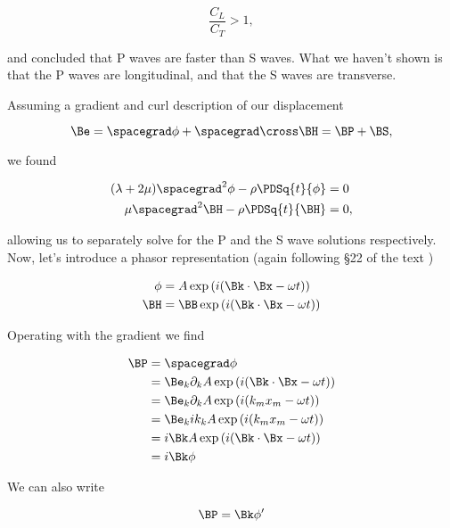 \begin{equation}\label{eqn:continuumL8:70}
\frac{C_L}{C_T} > 1,
\end{equation}

and concluded that P waves are faster than S waves.  What we haven't shown is that the P waves are longitudinal, and that the S waves are transverse.

Assuming a gradient and curl description of our displacement

\begin{equation}\label{eqn:continuumL8:90}
\Be = \spacegrad \phi + \spacegrad \cross \BH = \BP + \BS,
\end{equation}

we found

\begin{align}\label{eqn:continuumL8:110}
(\lambda + 2 \mu) \spacegrad^2 \phi - \rho \PDSq{t}{\phi} &= 0 \\
\mu \spacegrad^2 \BH - \rho \PDSq{t}{\BH} &= 0,
\end{align}

allowing us to separately solve for the P and the S wave solutions respectively.  Now, let's introduce a phasor representation (again following \S 22 of the text \cite{landau1960theory})

\begin{align}\label{eqn:continuumL8:130}
\phi &= A \exp\left( i ( \Bk \cdot \Bx - \omega t) \right) \\
\BH &= \BB \exp\left( i ( \Bk \cdot \Bx - \omega t) \right)
\end{align}

Operating with the gradient we find

\begin{align*}
\BP
&= \spacegrad \phi \\
&= \Be_k \partial_k A \exp\left( i ( \Bk \cdot \Bx - \omega t) \right) \\
&= \Be_k \partial_k A \exp\left( i ( k_m x_m - \omega t) \right) \\
&= \Be_k i k_k A \exp\left( i ( k_m x_m - \omega t) \right) \\
&= i \Bk A \exp\left( i ( \Bk \cdot \Bx - \omega t) \right) \\
&= i \Bk \phi
\end{align*}

We can also write

\begin{equation}\label{eqn:continuumL8:150}
\BP = \Bk \phi'
\end{equation}

